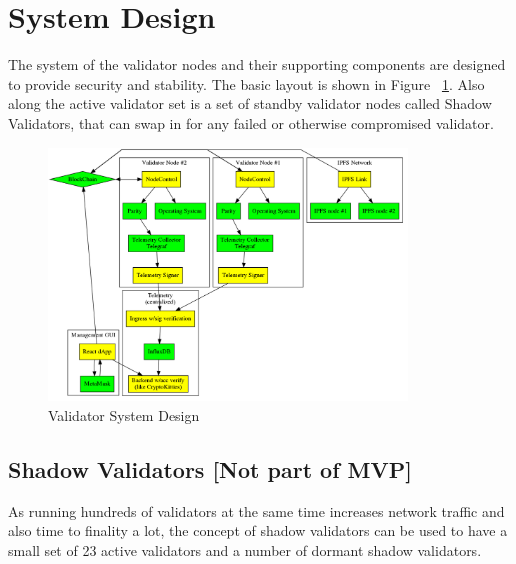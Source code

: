 \section{System Design}

The system of the validator nodes and their supporting components are designed to provide security and stability. The basic layout is shown in Figure ~\ref{fig:sysdesign}.
Also along the active validator set is a set of standby validator nodes called Shadow Validators, that can swap in for any failed or otherwise compromised validator.

\begin{figure}[ht]
	\centering
    \includegraphics[width=0.85\textwidth,keepaspectratio]{./images/sys-diagram.png}
	\caption{Validator System Design}
	\label{fig:sysdesign}
\end{figure}

\subsection{Shadow Validators [Not part of MVP]}

As running hundreds of validators at the same time increases network traffic and also time to finality a lot, the concept of shadow validators can be used to have a small set of 23 active validators and a number of dormant shadow validators.

